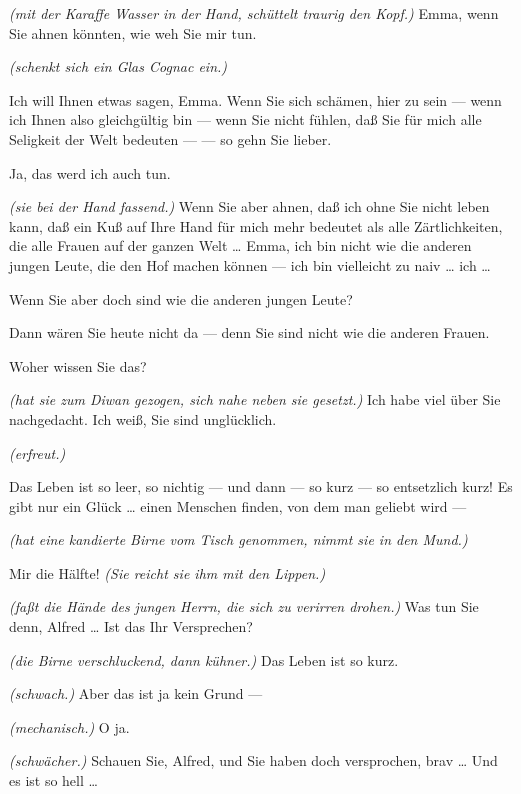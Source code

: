 \documentclass[
	final,
	a4paper,
	ngerman,
	mpinclude = true, %
	twoside = true,
	open = right,
	cleardoublepage = plain,
	DIV = 13,
	BCOR = 1cm,
	titlepage = firstiscover,
	]{scrbook}
\newcommand{\direction}[1]{\textit{(#1)}}
\newcommand{\thecharacter}[1]{\textup{\textsc{#1}}\xspace}
\newcommand{\theherr}{\thecharacter{Junger Herr}}
\newcommand{\thefrau}{\thecharacter{Junge Frau}}
\newcommand{\character}[1]{\item[#1:]}
\newcommand{\herr}{\character{\theherr}}
\newcommand{\frau}{\character{\thefrau}}
\begin{document}
\begin{play}
	\herr
	\direction{mit der Karaffe Wasser in der Hand, schüttelt traurig den Kopf.} Emma, wenn Sie ahnen könnten, wie weh Sie mir tun.

	\frau
	\direction{schenkt sich ein Glas Cognac ein.}

	\herr
	Ich will Ihnen etwas sagen, Emma. Wenn Sie sich schämen, hier zu sein --- wenn ich Ihnen also gleichgültig bin --- wenn Sie nicht fühlen, daß Sie für mich alle Seligkeit der Welt bedeuten --- --- so gehn Sie lieber.

	\frau
	Ja, das werd ich auch tun.

	\herr
	\direction{sie bei der Hand fassend.} Wenn Sie aber ahnen, daß ich ohne Sie nicht leben kann, daß ein Kuß auf Ihre Hand für mich mehr bedeutet als alle Zärtlichkeiten, die alle Frauen auf der ganzen Welt \ldots{} Emma, ich bin nicht wie die anderen jungen Leute, die den Hof machen können --- ich bin vielleicht zu naiv \ldots{} ich \ldots{}

	\frau
	Wenn Sie aber doch sind wie die anderen jungen Leute?

	\herr
	Dann wären Sie heute nicht da --- denn Sie sind nicht wie die anderen Frauen.

	\frau
	Woher wissen Sie das?

	\herr
	\direction{hat sie zum Diwan gezogen, sich nahe neben sie gesetzt.} Ich habe viel über Sie nachgedacht. Ich weiß, Sie sind unglücklich.

	\frau
	\direction{erfreut.}

	\herr
	Das Leben ist so leer, so nichtig --- und dann --- so kurz --- so entsetzlich kurz! Es gibt nur ein Glück \ldots{} einen Menschen finden, von dem man geliebt wird ---

	\frau
	\direction{hat eine kandierte Birne vom Tisch genommen, nimmt sie in den Mund.}

	\herr
	Mir die Hälfte! \direction{Sie reicht sie ihm mit den Lippen.}

	\frau
	\direction{faßt die Hände des jungen Herrn, die sich zu verirren drohen.} Was tun Sie denn, Alfred \ldots{} Ist das Ihr Versprechen?

	\herr
	\direction{die Birne verschluckend, dann kühner.} Das Leben ist so kurz.

	\frau
	\direction{schwach.} Aber das ist ja kein Grund ---

	\herr
	\direction{mechanisch.} O ja.

	\frau
	\direction{schwächer.} Schauen Sie, Alfred, und Sie haben doch versprochen, brav \ldots{} Und es ist so hell \ldots{}


\end{play}
\end{document}
